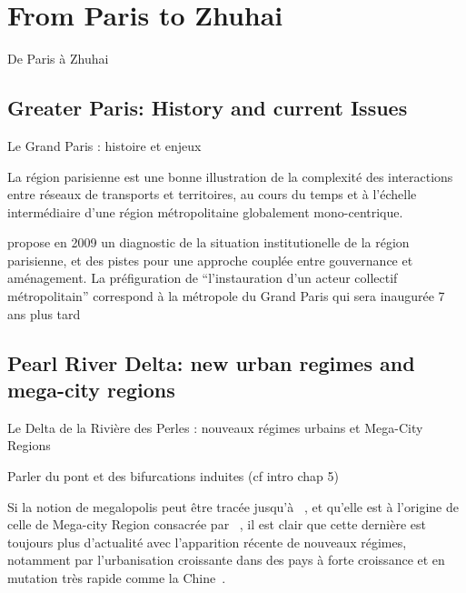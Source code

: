 




\section[From Paris to Zhuhai][De Paris à Zhuhai]{From Paris to Zhuhai}{De Paris à Zhuhai}

\label{sec:casestudies}







\subsection[Greater Paris][Grand Paris]{Greater Paris: History and current Issues}{Le Grand Paris : histoire et enjeux}


La région parisienne est une bonne illustration de la complexité des interactions entre réseaux de transports et territoires, au cours du temps et à l'échelle intermédiaire d'une région métropolitaine globalement mono-centrique.

\cite{gilli2009paris} propose en 2009 un diagnostic de la situation institutionelle de la région parisienne, et des pistes pour une approche couplée entre gouvernance et aménagement. La préfiguration de ``l'instauration d'un acteur collectif métropolitain'' correspond à la métropole du Grand Paris qui sera inaugurée 7 ans plus tard








\subsection[Pearl River Delta][Le Delta de la Rivière des Perles]{Pearl River Delta: new urban regimes and mega-city regions}{Le Delta de la Rivière des Perles : nouveaux régimes urbains et Mega-City Regions}



Parler du pont et des bifurcations induites (cf intro chap 5)

Si la notion de megalopolis peut être tracée jusqu'à ~\cite{gottmann1964megalopolis}, et qu'elle est à l'origine de celle de Mega-city Region consacrée par ~\cite{hall2006polycentric}, il est clair que cette dernière est toujours plus d'actualité avec l'apparition récente de nouveaux régimes, notamment par l'urbanisation croissante dans des pays à forte croissance et en mutation très rapide comme la Chine~\cite{swerts2015megacities}.







